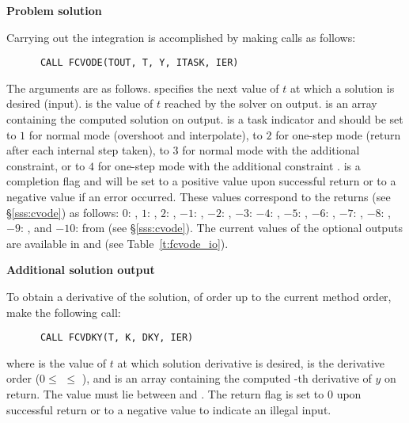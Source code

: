 \begin{Steps}
\item {\bf Problem solution}

  Carrying out the integration is accomplished by making calls as follows:
\begin{verbatim}
      CALL FCVODE(TOUT, T, Y, ITASK, IER)
\end{verbatim}
  The arguments are as follows.
   specifies the next value of $t$ at which a solution is desired (input).
   is the value of $t$ reached by the solver on output.
   is an array containing the computed solution on output.
   is a task indicator and should be set to $1$ for normal mode 
  (overshoot  and interpolate), to $2$ for one-step mode 
  (return after each internal step taken), to $3$ for normal mode with
  the additional  constraint, or to $4$ for one-step mode 
  with the additional constraint .
   is a completion flag and will be set to a positive value upon
  successful return or to a negative value if an error occurred. These values
  correspond to the  returns (see \S\ref{sss:cvode}) as follows:
  $0$: , $1$: , $2$: ,
  $-1$: , $-2$: , $-3$: 
  $-4$: , $-5$: ,
  $-6$: , $-7$: ,
  $-8$: , $-9$: , and
  $-10$:  from  (see \S\ref{sss:cvode}).
  The current values of the optional outputs are available in  and
   (see Table~\ref{t:fcvode_io}).
  
\item {\bf Additional solution output}

  To obtain a derivative of the solution, of order up to the current method
  order, make the following call:
\begin{verbatim}
      CALL FCVDKY(T, K, DKY, IER)
\end{verbatim}
  where
   is the value of $t$ at which solution derivative is desired,
   is the derivative order ($0 \le$  $\le$ ), and
   is an array containing the computed -th derivative of $y$
  on return.  The value  must lie between  and .
  The return flag  is set to $0$ upon successful return or to a negative
  value to indicate an illegal input.
  

\end{Steps}
